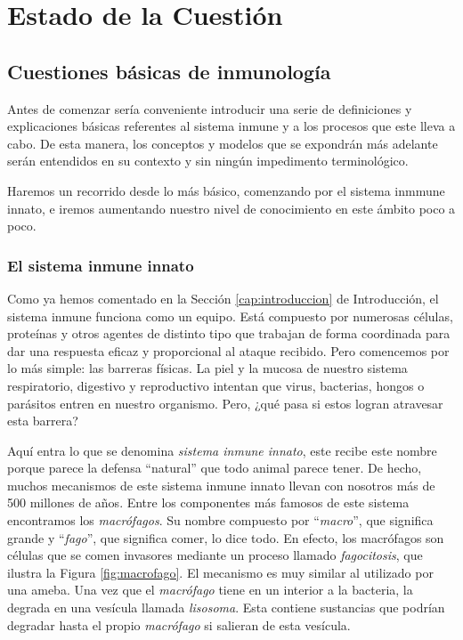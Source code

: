 \chapter{Estado de la Cuestión}
\label{cap:estadoDeLaCuestion}




\section{Cuestiones básicas de inmunología}

Antes de comenzar sería conveniente introducir una serie de definiciones y explicaciones básicas referentes al sistema inmune y a los procesos que este lleva a cabo. De esta manera, los conceptos y modelos que se expondrán más adelante serán entendidos en su contexto y sin ningún impedimento terminológico. 

Haremos un recorrido desde lo más básico, comenzando por el sistema inmmune innato, e iremos aumentando nuestro nivel de conocimiento en este ámbito poco a poco. 

\subsection{El sistema inmune innato}
Como ya hemos comentado en la Sección \ref{cap:introduccion} de Introducción, el sistema inmune funciona como un equipo. Está compuesto por numerosas células, proteínas y otros agentes de distinto tipo que trabajan de forma coordinada para dar una respuesta eficaz y proporcional al ataque recibido. Pero comencemos por lo más simple: las barreras físicas. La piel y la mucosa de nuestro sistema respiratorio, digestivo y reproductivo intentan que virus, bacterias, hongos o parásitos entren en nuestro organismo. Pero, ¿qué pasa si estos logran atravesar esta barrera?

Aquí entra lo que se denomina \textit{sistema inmune innato}, este recibe este nombre porque parece la defensa ``natural'' que todo animal parece tener. De hecho, muchos mecanismos de este sistema inmune innato llevan con nosotros más de 500 millones de años. 
Entre los componentes más famosos de este sistema encontramos los \textit{macrófagos}. Su nombre compuesto por ``\textit{macro}'', que significa grande y ``\textit{fago}'', que significa comer, lo dice todo. En efecto, los macrófagos son células que se comen invasores mediante un proceso llamado \textit{fagocitosis}, que ilustra la Figura \ref{fig:macrofago}. El mecanismo es muy similar al utilizado por una ameba. Una vez que el \textit{macrófago} tiene en un interior a la bacteria, la degrada en una vesícula llamada \textit{lisosoma}. Esta contiene sustancias que podrían degradar hasta el propio \textit{macrófago} si salieran de esta vesícula. 


